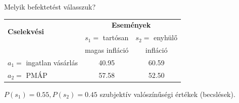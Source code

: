 \documentclass[a4paper,12pt]{article}
\begin{document}






Melyik befektetést válasszuk?

\begin{center}
\begin{tabular}{l|c|c}
\multirow{2}{*}{\bf Cselekvési} &  \multicolumn{2}{c}{ \bf Események }\\
 {\bf lehetőségek} & $s_1=$ tartósan & $s_2=$ enyhülő \\
  & magas infláció &  infláció \\
\hline
  $a_1=$ ingatlan vásárlás & 40.95 & 60.59 \\
  $a_2=$ PMÁP & 57.58 & 52.50 \\
\end{tabular}
\end{center}
$P(s_1) = 0.55 , P(s_2) = 0.45$ szubjektív valószínűségi értékek (becslések).
\end{document}
